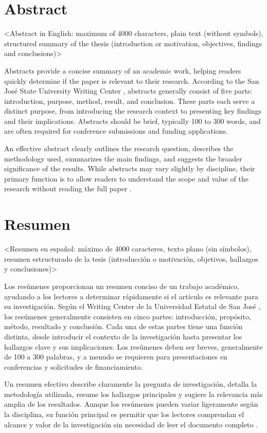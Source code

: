 %
\clearpage
{}
\setcounter{page}{1}

\chapter*{Abstract} \label{chap::abstract}

<Abstract in English: maximum of 4000 characters, plain text (without symbols), structured summary of the thesis (introduction or motivation, objectives, findings and conclusions)>

Abstracts provide a concise summary of an academic work, helping readers quickly determine if the paper is relevant to their research. According to the San José State University Writing Center \cite{SJSUWritingAbstract}, abstracts generally consist of five parts: introduction, purpose, method, result, and conclusion. These parts each serve a distinct purpose, from introducing the research context to presenting key findings and their implications. Abstracts should be brief, typically 100 to 300 words, and are often required for conference submissions and funding applications.

An effective abstract clearly outlines the research question, describes the methodology used, summarizes the main findings, and suggests the broader significance of the results. While abstracts may vary slightly by discipline, their primary function is to allow readers to understand the scope and value of the research without reading the full paper \cite{SJSUWritingAbstract}.

\chapter*{Resumen} \label{chap::resumen}

<Resumen en español: máximo de 4000 caracteres, texto plano (sin símbolos), resumen estructurado de la tesis (introducción o motivación, objetivos, hallazgos y conclusiones)>

Los resúmenes proporcionan un resumen conciso de un trabajo académico, ayudando a los lectores a determinar rápidamente si el artículo es relevante para su investigación. Según el Writing Center de la Universidad Estatal de San José \cite{SJSUWritingAbstract}, los resúmenes generalmente consisten en cinco partes: introducción, propósito, método, resultado y conclusión. Cada una de estas partes tiene una función distinta, desde introducir el contexto de la investigación hasta presentar los hallazgos clave y sus implicaciones. Los resúmenes deben ser breves, generalmente de 100 a 300 palabras, y a menudo se requieren para presentaciones en conferencias y solicitudes de financiamiento.

Un resumen efectivo describe claramente la pregunta de investigación, detalla la metodología utilizada, resume los hallazgos principales y sugiere la relevancia más amplia de los resultados. Aunque los resúmenes pueden variar ligeramente según la disciplina, su función principal es permitir que los lectores comprendan el alcance y valor de la investigación sin necesidad de leer el documento completo \cite{SJSUWritingAbstract}.
